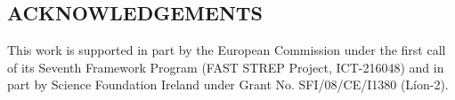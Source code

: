 \documentclass[a4paper,twoside]{article}
\begin{document}
\onecolumn \maketitle \normalsize \vfill













\begin{small}
\section*{ACKNOWLEDGEMENTS} This work is supported in part by the European Commission under the first call of its Seventh Framework Program (FAST STREP Project, ICT-216048) and in part by Science Foundation Ireland under Grant No. SFI/08/CE/I1380 (L\'ion-2).
\end{small}

\renewcommand{\baselinestretch}{0.98}

{\small
}
\renewcommand{\baselinestretch}{1}
\end{document}
